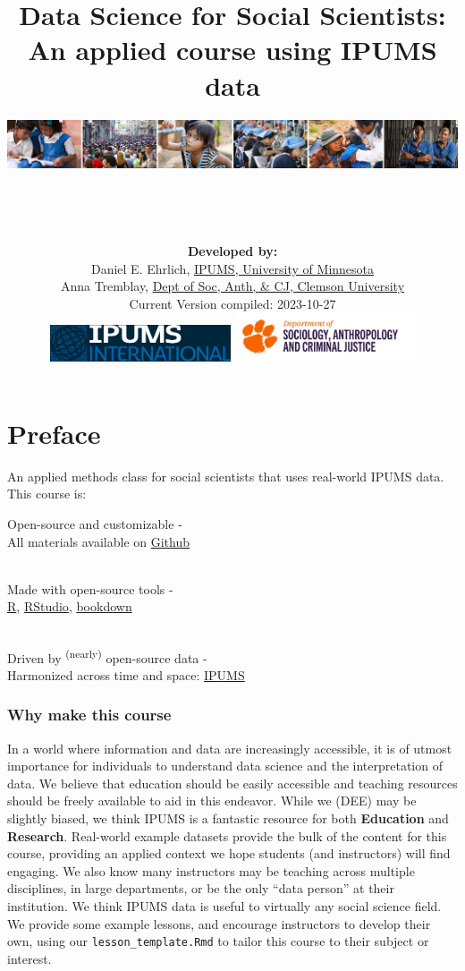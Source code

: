 \documentclass[
]{book}
\title{Data Science for Social Scientists: An applied course using IPUMS data}
\author{\includegraphics{ipums_banner.png}\\
\strut \\
\strut \\
\textbf{Developed by:}\\
\hspace*{0.333em}\hspace*{0.333em}\hspace*{0.333em}Daniel E. Ehrlich, \href{https://international.ipums.org/international/}{IPUMS, University of Minnesota}\\
\hspace*{0.333em}\hspace*{0.333em}\hspace*{0.333em}Anna Tremblay, \href{https://www.clemson.edu/cbshs/departments/sacj/degrees/anthropology.html}{Dept of Soc, Anth, \& CJ, Clemson University}\\
\hspace*{0.333em}\hspace*{0.333em}\hspace*{0.333em}Current Version compiled: 2023-10-27\\
\includegraphics[width=0.4\textwidth,height=\textheight]{ipums_i_logo.jpg} \includegraphics[width=0.4\textwidth,height=\textheight]{clemson_logo.png}\\
}
\date{}
\begin{document}
\maketitle

{
\setcounter{tocdepth}{1}
\tableofcontents
}
\hypertarget{preface}{%
\chapter*{Preface}\label{preface}}

An applied methods class for social scientists that uses real-world IPUMS data. This course is:

Open-source and customizable -\\
\hspace*{0.333em}\hspace*{0.333em}\hspace*{0.333em}All materials available on \href{https://github.com/ehrlichd/ipumsEDbook}{Github}\\
\strut \\
Made with open-source tools -\\
\hspace*{0.333em}\hspace*{0.333em}\href{https://cran.r-project.org/}{R}, \href{https://www.rstudio.com/products/rstudio/}{RStudio}, \href{https://bookdown.org/}{bookdown}\\
\strut \\
Driven by \textsuperscript{(nearly)} open-source data -\\
\hspace*{0.333em}\hspace*{0.333em}Harmonized across time and space: \href{https://ipums.org}{IPUMS}\\

\hypertarget{why-make-this-course}{%
\subsection*{Why make this course}\label{why-make-this-course}}

In a world where information and data are increasingly accessible, it is of utmost importance for individuals to understand data science and the interpretation of data. We believe that education should be easily accessible and teaching resources should be freely available to aid in this endeavor. While we (DEE) may be slightly biased, we think IPUMS is a fantastic resource for both \textbf{Education} and \textbf{Research}. Real-world example datasets provide the bulk of the content for this course, providing an applied context we hope students (and instructors) will find engaging. We also know many instructors may be teaching across multiple disciplines, in large departments, or be the only ``data person'' at their institution. We think IPUMS data is useful to virtually any social science field. We provide some example lessons, and encourage instructors to develop their own, using our \texttt{lesson\_template.Rmd} to tailor this course to their subject or interest.
\end{document}
